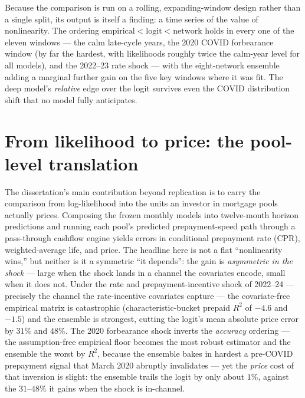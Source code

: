 Because the comparison is run on a rolling, expanding-window design
rather than a single split, its output is itself a finding: a time
series of the value of nonlinearity. The ordering
$\text{empirical} < \text{logit} < \text{network}$ holds in every one of
the eleven windows --- the calm late-cycle years, the 2020 COVID
forbearance window (by far the hardest, with likelihoods roughly twice
the calm-year level for all models), and the 2022--23 rate shock ---
with the eight-network ensemble adding a marginal further gain on the
five key windows where it was fit. The deep model's \emph{relative} edge over the logit
survives even the COVID distribution shift that no model fully
anticipates.

\section{From likelihood to price: the pool-level translation}
\label{sec:concl-pool}

The dissertation's main contribution beyond replication is to carry the
comparison from log-likelihood into the units an investor in mortgage
pools actually prices. Composing the frozen monthly models into
twelve-month horizon predictions and running each pool's predicted
prepayment-speed path through a pass-through cashflow engine yields
errors in conditional prepayment rate (CPR), weighted-average life, and
price. The headline here is not a flat ``nonlinearity wins,'' but
neither is it a symmetric ``it depends'': the gain is \emph{asymmetric
in the shock} --- large when the shock lands in a channel the covariates
encode, small when it does not. Under the
rate and prepayment-incentive shock of 2022--24 --- precisely the
channel the rate-incentive covariates capture --- the covariate-free
empirical matrix is catastrophic (characteristic-bucket prepaid $R^2$
of $-4.6$ and $-1.5$) and the ensemble is strongest, cutting the
logit's mean absolute price error by $31\%$ and $48\%$. The 2020
forbearance shock inverts the \emph{accuracy} ordering --- the
assumption-free empirical floor becomes the most robust estimator and
the ensemble the worst by $R^2$, because the ensemble bakes in hardest a
pre-COVID prepayment signal that March 2020 abruptly invalidates ---
yet the \emph{price} cost of that inversion is slight: the ensemble
trails the logit by only about $1\%$, against the $31$--$48\%$ it gains
when the shock is in-channel.

